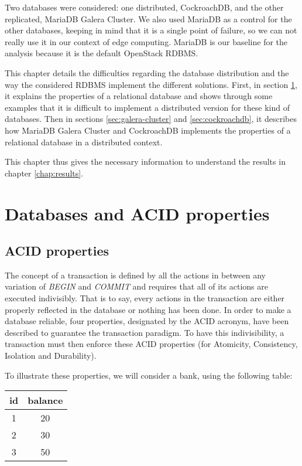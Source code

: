 Two databases were considered: one distributed, CockroachDB, and the other replicated, MariaDB Galera Cluster. We also used MariaDB as a control for the other databases, keeping in mind that it is a single point of failure, so we can not really use it in our context of edge computing. MariaDB is our baseline for the analysis because it is the default OpenStack RDBMS.

This chapter details the difficulties regarding the database distribution and the way the considered RDBMS implement the different solutions. First, in section \ref{sec:databases}, it explains the properties of a relational database and shows through some examples that it is difficult to implement a distributed version for these kind of databases. Then in sections \ref{sec:galera-cluster} and \ref{sec:cockroachdb}, it describes how MariaDB Galera Cluster and CockroachDB implements the properties of a relational database in a distributed context.

This chapter thus gives the necessary information to understand the results in chapter \ref{chap:results}.


\section{Databases and ACID properties}
\label{sec:databases}
\subsection{ACID properties}
The concept of a transaction is defined by all the actions in between any variation of \emph{BEGIN} and \emph{COMMIT} and requires that all of its actions are executed indivisibly. That is to say, every actions in the transaction are either properly reflected in the database or nothing has been done\cite{DBLP:journals/csur/HarderR83}. In order to make a database reliable, four properties, designated by the ACID acronym, have been described to guarantee the transaction paradigm. To have this indivisibility, a transaction must then enforce these ACID properties (for Atomicity, Consistency, Isolation and Durability).

To illustrate these properties, we will consider a bank, using the following table:

\begin{center}
\begin{tabular}{c | c}
id & balance\\
\hline
1 & 20\\
2 & 30\\
3 & 50\\
\end{tabular}
\end{center}

